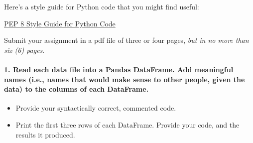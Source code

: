 \documentclass[11pt]{article}
\providecommand{\tightlist}{%
      \setlength{\itemsep}{0pt}\setlength{\parskip}{0pt}}
\begin{document}
Here's a style guide for Python code that you might find useful:

\href{https://www.python.org/dev/peps/pep-0008/}{PEP 8 Style Guide for
Python Code}

Submit your assignment in a pdf file of three or four pages, \emph{but
in no more than six (6) pages}.

    \paragraph{1. Read each data file into a Pandas DataFrame. Add
meaningful names (i.e., names that would make sense to other people,
given the data) to the columns of each
DataFrame.}\label{read-each-data-file-into-a-pandas-dataframe.-add-meaningful-names-i.e.-names-that-would-make-sense-to-other-people-given-the-data-to-the-columns-of-each-dataframe.}

\begin{itemize}
\tightlist
\item
  Provide your syntactically correct, commented code.
\item
  Print the first three rows of each DataFrame. Provide your code, and
  the results it produced.
\end{itemize}
\end{document}
